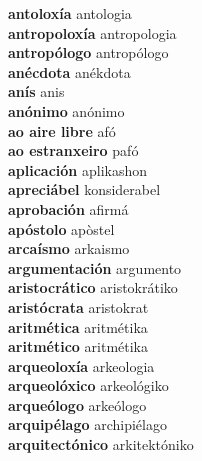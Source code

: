 \textbf{ antoloxía  } antologia \\
\textbf{ antropoloxía  } antropologia \\
\textbf{ antropólogo  } antropólogo \\
\textbf{ anécdota  } anékdota \\
\textbf{ anís  } anis \\
\textbf{ anónimo  } anónimo \\
\textbf{ ao aire libre  } afó \\
\textbf{ ao estranxeiro  } pafó \\
\textbf{ aplicación  } aplikashon \\
\textbf{ apreciábel  } konsiderabel \\
\textbf{ aprobación  } afirmá \\
\textbf{ apóstolo  } apòstel \\
\textbf{ arcaísmo  } arkaismo \\
\textbf{ argumentación  } argumento \\
\textbf{ aristocrático  } aristokrátiko \\
\textbf{ aristócrata  } aristokrat \\
\textbf{ aritmética  } aritmétika \\
\textbf{ aritmético  } aritmétika \\
\textbf{ arqueoloxía  } arkeologia \\
\textbf{ arqueolóxico  } arkeológiko \\
\textbf{ arqueólogo  } arkeólogo \\
\textbf{ arquipélago  } archipiélago \\
\textbf{ arquitectónico  } arkitektóniko \\
